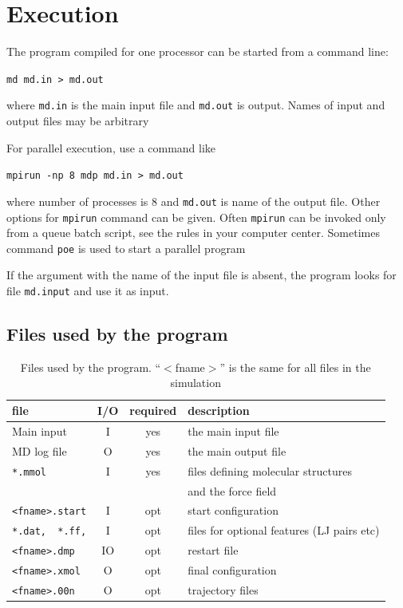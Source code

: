 \documentclass{article}
\begin{document}
\section{Execution}

The program compiled for one processor can be started from a command line:

\verb|md md.in > md.out|

where \verb|md.in| is the main input file and \verb|md.out| is output. Names
of input and output files may be arbitrary

For parallel execution, use a command like

\verb|mpirun -np 8 mdp md.in > md.out|

where number of processes is 8 and \verb|md.out| is name of the output file.
Other options for \verb|mpirun| command can be given. Often 
\verb|mpirun| can be invoked only from a queue batch script, see
the rules in your computer center. Sometimes command \verb|poe| is used
to start a parallel program

If the argument with the name of the input file is absent, the program 
looks for file \verb|md.input| and use it as input.



\subsection{Files used by the program}

\begin{table}[h!]
\caption{Files used by the program. ``$<$fname$>$'' is the same for all files
in the simulation}
\begin{tabular}{|lccl|}
\hline
file   &  I/O  &  required & description \\
\hline
Main input &  I  &  yes &  the main input file\\
MD log file & O  &  yes &  the main output file\\
\verb|*.mmol|   & I  &  yes &  files defining molecular structures \\
               &     &      &  and the force field \\
\verb|<fname>.start| & I & opt & start configuration \\
\verb|*.dat,  *.ff,| & I & opt & files for optional features (LJ pairs etc) \\
\verb|<fname>.dmp| & IO & opt & restart file \\
\verb|<fname>.xmol| & O & opt & final configuration \\
\verb|<fname>.00n| &  O & opt & trajectory files \\
\hline
\end{tabular}
\end{table}
\end{document}
